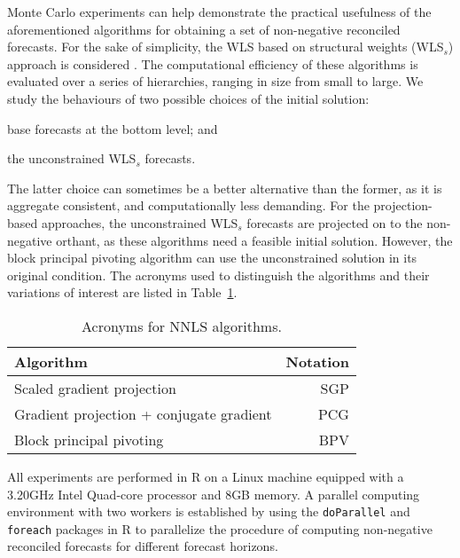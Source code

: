 \documentclass[11pt]{article}
\newcommand{\0}{\phantom{0}}
\begin{document}
Monte Carlo experiments can help demonstrate the practical usefulness of the aforementioned algorithms for obtaining a set of non-negative reconciled forecasts. For the sake of simplicity, the WLS based on structural weights (WLS$_{s}$) approach is considered \citep{Wick2018}. The computational efficiency of these algorithms is evaluated over a series of hierarchies, ranging in size from small to large. We study the behaviours of two possible choices of the initial solution: \begin{inparaenum}[(i)] \item base forecasts at the bottom level; and \item the unconstrained WLS$_{s}$ forecasts. \end{inparaenum} The latter choice can sometimes be a better alternative than the former, as it is aggregate consistent, and computationally less demanding. For the projection-based approaches, the unconstrained WLS$_{s}$ forecasts are projected on to the non-negative orthant, as these algorithms need a feasible initial solution. However, the block principal pivoting algorithm can use the unconstrained solution in its original condition. The acronyms used to distinguish the algorithms and their variations of interest are listed in Table~\ref{tbl:acronn}.

\begin{table}[ht]
	\centering

	\caption{Acronyms for NNLS algorithms.}
	\label{tbl:acronn}
	\begin{tabular}{lr}
		\toprule
		Algorithm                                & Notation \\
		\midrule
		Scaled gradient projection               & SGP      \\[0.1cm]
		Gradient projection + conjugate gradient & PCG      \\[0.1cm]
		Block principal pivoting                 & BPV      \\
		\bottomrule
	\end{tabular}
\end{table}

All experiments are performed in R on a Linux machine equipped with a 3.20GHz Intel Quad-core processor and 8GB memory. A parallel computing environment with two workers is established by using the \texttt{doParallel} \citep{doparallel2015} and \texttt{foreach} \citep{foreach2015} packages in R to parallelize the procedure of computing non-negative reconciled forecasts for different forecast horizons.
\end{document}
